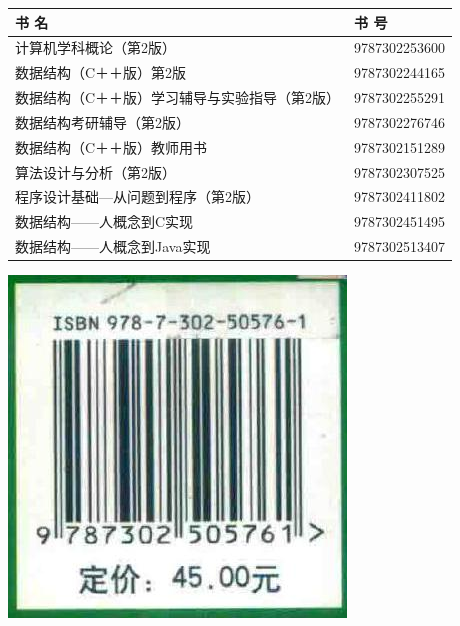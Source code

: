 \documentclass[10pt]{article}
\begin{document}
\begin{center}
\begin{tabular}{|l|l|}
\hline
书 名 & 书 号 \\
\hline
计算机学科概论（第2版） & 9787302253600 \\
\hline
数据结构（C＋＋版）第2版 & 9787302244165 \\
\hline
数据结构（C＋＋版）学习辅导与实验指导（第2版） & 9787302255291 \\
\hline
数据结构考研辅导（第2版） & 9787302276746 \\
\hline
数据结构（C＋＋版）教师用书 & 9787302151289 \\
\hline
算法设计与分析（第2版） & 9787302307525 \\
\hline
程序设计基础—从问题到程序（第2版） & 9787302411802 \\
\hline
数据结构——人概念到C实现 & 9787302451495 \\
\hline
数据结构——人概念到Java实现 & 9787302513407 \\
\hline
\end{tabular}
\end{center}

\begin{center}
\includegraphics[max width=\textwidth]{2025_06_06_704745ea57b15b2333e5g-002}
\end{center}
\end{document}
